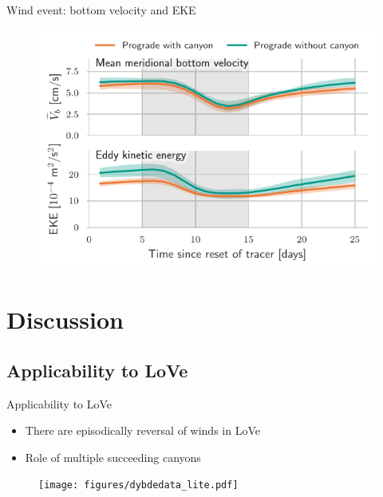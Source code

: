 \documentclass{beamer}
\begin{document}
\begin{frame}{Wind event: bottom velocity and EKE}
\begin{figure}
\centering
\includegraphics{figures/v_eke_Prograde_composite_Event.pdf}
\end{figure}
\end{frame}

\section{Discussion}

\subsection{Applicability to LoVe}
\begin{frame}{Applicability to LoVe}
\begin{itemize}
    \item There are episodically reversal of winds in LoVe
    \item Role of multiple succeeding canyons 
\end{itemize}

\begin{figure}
\centering
\texttt{[image: figures/dybdedata\_lite.pdf]}
\end{figure}

\end{frame}
\end{document}

